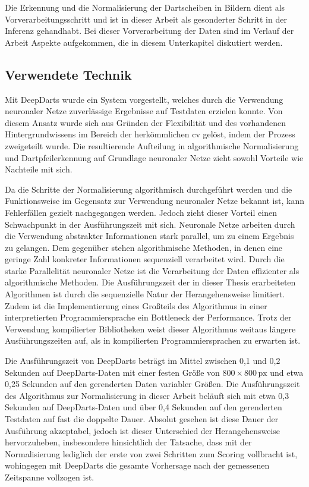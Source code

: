 Die Erkennung und die Normalisierung der Dartscheiben in Bildern dient als Vorverarbeitungsschritt und ist in dieser Arbeit als gesonderter Schritt in der Inferenz gehandhabt. Bei dieser Vorverarbeitung der Daten sind im Verlauf der Arbeit Aspekte aufgekommen, die in diesem Unterkapitel diskutiert werden.

\subsection{Verwendete Technik}

Mit DeepDarts wurde ein System vorgestellt, welches durch die Verwendung neuronaler Netze zuverlässige Ergebnisse auf Testdaten erzielen konnte. Von diesem Ansatz wurde sich aus Gründen der Flexibilität und des vorhandenen Hintergrundwissens im Bereich der herkömmlichen \ac{cv} gelöst, indem der Prozess zweigeteilt wurde. Die resultierende Aufteilung in algorithmische Normalisierung und Dartpfeilerkennung auf Grundlage neuronaler Netze zieht sowohl Vorteile wie Nachteile mit sich.

Da die Schritte der Normalisierung algorithmisch durchgeführt werden und die Funktionsweise im Gegensatz zur Verwendung neuronaler Netze bekannt ist, kann Fehlerfällen gezielt nachgegangen werden. Jedoch zieht dieser Vorteil einen Schwachpunkt in der Ausführungszeit mit sich. Neuronale Netze arbeiten durch die Verwendung abstrakter Informationen stark parallel, um zu einem Ergebnis zu gelangen. Dem gegenüber stehen algorithmische Methoden, in denen eine geringe Zahl konkreter Informationen sequenziell verarbeitet wird. Durch die starke Parallelität neuronaler Netze ist die Verarbeitung der Daten effizienter als algorithmische Methoden. Die Ausführungszeit der in dieser Thesis erarbeiteten Algorithmen ist durch die sequenzielle Natur der Herangehensweise limitiert. Zudem ist die Implementierung eines Großteils des Algorithmus in einer interpretierten Programmiersprache ein Bottleneck der Performance. Trotz der Verwendung kompilierter Bibliotheken weist dieser Algorithmus weitaus längere Ausführungszeiten auf, als in kompilierten Programmiersprachen zu erwarten ist.

Die Ausführungszeit von DeepDarts beträgt im Mittel zwischen 0,1 und 0,2 Sekunden auf DeepDarts-Daten mit einer festen Größe von $800 \times 800\,\text{px}$ und etwa 0,25 Sekunden auf den gerenderten Daten variabler Größen. Die Ausführungszeit des Algorithmus zur Normalisierung in dieser Arbeit beläuft sich mit etwa 0,3 Sekunden auf DeepDarts-Daten und über 0,4 Sekunden auf den gerenderten Testdaten auf fast die doppelte Dauer. Absolut gesehen ist diese Dauer der Ausführung akzeptabel, jedoch ist dieser Unterschied der Herangehensweise hervorzuheben, insbesondere hinsichtlich der Tatsache, dass mit der Normalisierung lediglich der erste von zwei Schritten zum Scoring vollbracht ist, wohingegen mit DeepDarts die gesamte Vorhersage nach der gemessenen Zeitspanne vollzogen ist.

